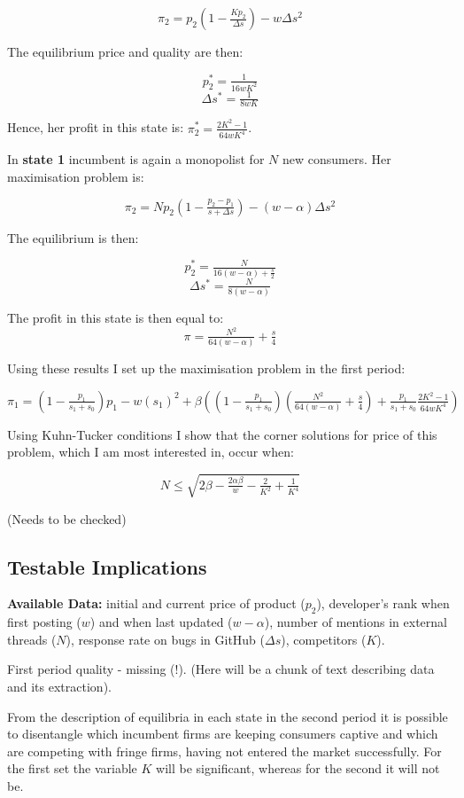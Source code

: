 \documentclass{article}
\numberwithin{figure}{section}
\numberwithin{table}{section}
\theoremstyle{indented}
\numberwithin{equation}{section} %
\begin{document}
$$\pi_2 = p_2(1-\tfrac{Kp_2}{\Delta s}) - w\Delta s^2$$

The equilibrium price and quality are then:

$$p_2^* = \tfrac{1}{16wK^2}$$
$$\Delta s^* = \tfrac{1}{8wK}$$

Hence, her profit in this state is: $\pi^*_2 = \tfrac{2K^2-1}{64wK^4}$.

In \textbf{state 1} incumbent is again a monopolist for $N$ new consumers. Her maximisation problem is:

$$\pi_2 = Np_2(1-\tfrac{p_2 - p_1}{s+\Delta s}) - (w-\alpha)\Delta s^2$$

The equilibrium is then:

$$p_2^* = \tfrac{N}{16(w-\alpha) + \tfrac{s}{2}}$$
$$\Delta s^* = \tfrac{N}{8(w-\alpha)}$$

The profit in this state is then equal to:
$$\pi = \tfrac{N^2}{64(w-\alpha)}+ \tfrac{s}{4}$$

Using these results I set up the maximisation problem in the first period:

$$\pi_1 = (1-\tfrac{p_1}{s_1+s_0})p_1 - w(s_1)^2+\beta ((1-\tfrac{p_1}{s_1+s_0})(\tfrac{N^2}{64(w-\alpha)}+ \tfrac{s}{4})+\tfrac{p_1}{s_1+s_0}\tfrac{2K^2-1}{64wK^4})$$

Using Kuhn-Tucker conditions I show that the corner solutions for price of this problem, which I am most interested in, occur when:

$$N \leq  \sqrt{2\beta - \tfrac{2\alpha\beta}{w}- \tfrac{2}{K^2}+ \tfrac{1}{K^4} }$$

(Needs to be checked)



\subsection{Testable Implications}

\textbf{Available Data:} initial and current price of product ($p_2$), developer's rank when first posting ($w$) and when last updated ($w-\alpha$), number of mentions in external threads ($N$), response rate on bugs in GitHub ($\Delta s$), competitors ($K$).

First period quality - missing (!).
(Here will be a chunk of text describing data and its extraction).

From the description of equilibria in each state in the second period it is possible to disentangle which incumbent firms are keeping consumers captive and which are competing with fringe firms, having not entered the market successfully. For the first set the variable $K$ will be significant, whereas for the second it will not be.
\end{document}
